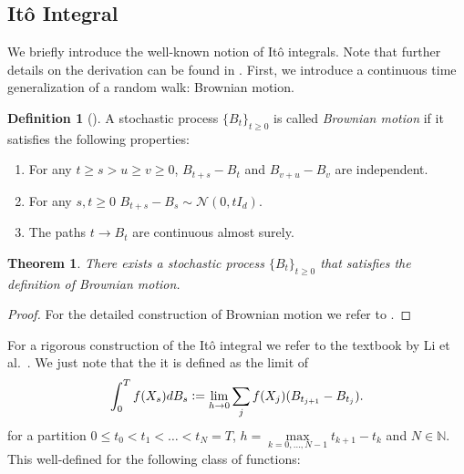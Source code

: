 \documentclass[12pt]{article}
\newtheorem{theorem}{Theorem}[section]
\theoremstyle{definition}
\newtheorem{definition}[definition]{Definition}
\numberwithin{equation}{section}
\newcommand{\N}{\mathbb{N}}
\newcommand{\R}{\mathbb{R}}
\newcommand{\CN}{\mathcal{N}}
\newcommand{\defeq}{\vcentcolon=}
\begin{document}
\subsection{Itô Integral}
\label{subsec:ItoIntegral}
We briefly introduce the well-known notion of Itô integrals. Note that further details on the derivation can be found in \autocite{eAppliedStochasticAnalysis2021}. 
First, we introduce a continuous time generalization of a random walk: Brownian motion.
\begin{definition}[\autocite{durrettProbabilityTheoryExamples2019}]
  A stochastic process $\{B_t\}_{t \geq 0}$ is called \emph{Brownian motion} if it satisfies the following properties:
  \begin{enumerate}[label=(\roman*)]
    \item For any $t \geq s > u \geq v \geq 0$, $B_{t+s} - B_t$ and $B_{v+u} - B_v$ are independent.
    \item For any $s,t \geq 0$ $B_{t+s} - B_s \sim \CN(0, tI_d)$.
    \item The paths $t \rightarrow B_t$ are continuous almost surely.
  \end{enumerate}
\end{definition}
\begin{theorem}
  There exists a stochastic process $\{B_t\}_{t \geq 0}$ that satisfies the definition of Brownian motion.
\end{theorem}
\begin{proof}
  For the detailed construction of Brownian motion we refer to \autocite{durrettProbabilityTheoryExamples2019}.
\end{proof}
For a rigorous construction of the Itô integral we refer to the textbook by Li et al.\ \cite{eAppliedStochasticAnalysis2021}.
We just note that the it is defined as the limit of 
\begin{equation*}
  \int_0^T f(X_s) dB_s \defeq \lim\limits_{h \rightarrow 0} \sum_j f(X_j)(B_{t_{j+1}} - B_{t_j}).
\end{equation*}
for a partition $0 \leq t_0 < t_1 < \dots < t_N = T$, $h = \max\limits_{k=0,\dots,N-1} t_{k+1} - t_k$ and $N \in \N$. This well-defined for the following class of functions:
\end{document}
